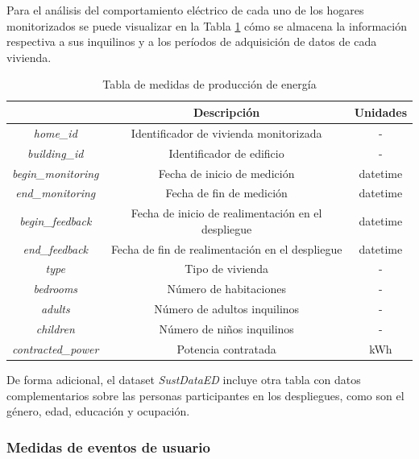 Para el análisis del comportamiento eléctrico de cada uno de los hogares monitorizados se puede visualizar en la Tabla \ref{tab:demo} cómo se almacena la información respectiva a sus inquilinos y a los períodos de adquisición de datos de cada vivienda.

\vspace{3mm}

\begin{table}[h!]
    \centering
    \begin{tabular}{|c|c|c|}
    \hline
    \rowcolor[HTML]{AAAAAA} 
    \multicolumn{1}{|c|}{\cellcolor[HTML]{AAAAAA}Campo} & \multicolumn{1}{c|}{\cellcolor[HTML]{AAAAAA}Descripción} & Unidades \\ \hline
    \textit{home\_id} & Identificador de vivienda monitorizada & - \\ \hline
    \textit{building\_id} & Identificador de edificio & - \\ \hline
    \textit{begin\_monitoring} & Fecha de inicio de medición & datetime \\ \hline
    \textit{end\_monitoring} & Fecha de fin de medición & datetime \\ \hline
    \textit{begin\_feedback} & Fecha de inicio de realimentación en el despliegue & datetime \\ \hline
    \textit{end\_feedback} & Fecha de fin de realimentación en el despliegue & datetime \\ \hline
    \textit{type} & Tipo de vivienda & - \\ \hline
    \textit{bedrooms} & Número de habitaciones & - \\ \hline
    \textit{adults} & Número de adultos inquilinos & - \\ \hline
    \textit{children} & Número de niños inquilinos & - \\ \hline
    \textit{contracted\_power} & Potencia contratada & kWh \\ \hline
    \end{tabular}
    \caption{Tabla de medidas de producción de energía \cite{sustdata}}
    \label{tab:demo}
\end{table}

De forma adicional, el dataset \textit{SustDataED} incluye otra tabla con datos complementarios sobre las personas participantes en los despliegues, como son el género, edad, educación y ocupación.

\subsubsection{Medidas de eventos de usuario}

